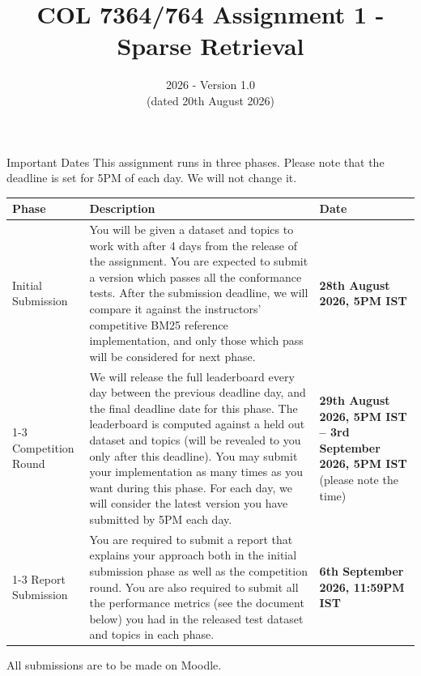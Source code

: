 \documentclass[10pt]{article}
\newcommand{\STARTDAY}{4\xspace}
\begin{document}
\title{COL 7364/764 Assignment 1 - Sparse Retrieval}
\date{2026 - Version 1.0 \\(dated 20th August 2026)}
\maketitle
\noindent
\begin{mybox}{Important Dates} 
This assignment runs in three phases. Please note that the deadline is set for 5PM of each day. We will not change it. 
\begin{center}
\begin{tabular}{l p{8cm} p{3cm} }
\toprule
\textbf{Phase} & \textbf{Description} & \textbf{Date} \\
\midrule
Initial Submission & You will be given a dataset and topics to work with after \STARTDAY days from the release of the assignment. You are expected to submit a version which passes all the conformance tests. After the submission deadline, we will compare it against the instructors' competitive BM25 reference implementation, and only those which pass will be considered for next phase. & \textbf{28th August 2026, 5PM IST} \\
\cmidrule(lr){1-3}
Competition Round & We will release the full leaderboard every day between the previous deadline day, and the final deadline date for this phase. The leaderboard is computed against a held out dataset and topics (will be revealed to you only after this deadline). You may submit your implementation as many times as you want during this phase. For each day, we will consider the latest version you have submitted by 5PM each day. & \textbf{29th August 2026, 5PM IST -- 3rd September 2026, 5PM IST} (please note the time) \\ 
\cmidrule(lr){1-3}
Report Submission & You are required to submit a report that explains your approach both in the initial submission phase as well as the competition round. You are also required to submit all the performance metrics (see the document below) you had in the released test dataset and topics in each phase. &  \textbf{6th September 2026, 11:59PM IST} \\ 
\bottomrule
\end{tabular}
\end{center}

All submissions are to be made on Moodle. 
\end{mybox}
\end{document}
